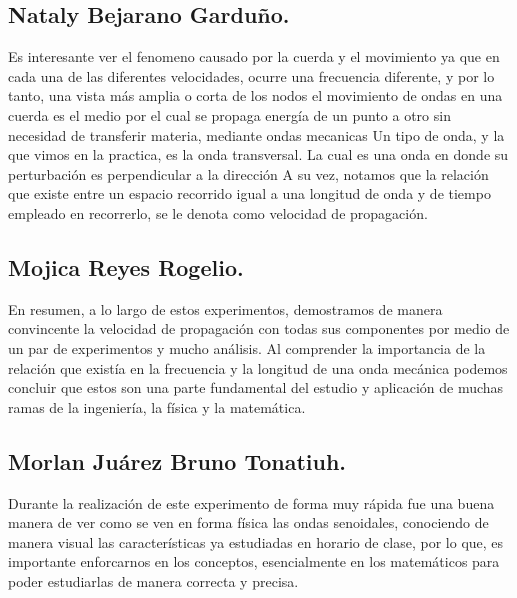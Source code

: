 \documentclass[10pt]{article}
\begin{document}
\begin{multicols}{2}
\subsection{Nataly Bejarano Garduño.}
Es interesante ver el fenomeno causado por la cuerda y el movimiento ya que en cada una de las diferentes velocidades, ocurre una frecuencia diferente, y por lo tanto, una vista más amplia o corta de los nodos el movimiento de ondas en una cuerda es el medio por el cual se propaga energía de un punto a otro sin necesidad de transferir materia, mediante ondas mecanicas Un tipo de onda, y la que vimos en la practica, es la onda transversal. La cual es una onda en donde su perturbación es perpendicular a la dirección A su vez, notamos que la relación que existe entre un espacio recorrido igual a una longitud de onda y de tiempo empleado en recorrerlo, se le denota como velocidad de propagación.
\subsection{Mojica Reyes Rogelio.}
En resumen, a lo largo de estos experimentos, demostramos de manera convincente la velocidad de propagación con todas sus componentes por medio de un par de experimentos y mucho análisis. Al comprender la importancia de la relación que existía en la frecuencia y la longitud de una onda mecánica podemos concluir que estos son una parte fundamental del estudio y aplicación de muchas ramas de la ingeniería, la física y la matemática. 
\subsection*{Morlan Juárez Bruno Tonatiuh.}
Durante la realización de este experimento de forma muy rápida fue una buena manera de ver como se ven en forma física las ondas senoidales, conociendo de manera visual las características ya estudiadas en horario de clase, por lo que, es importante enforcarnos en los conceptos, esencialmente en los matemáticos para poder estudiarlas de manera correcta y precisa. 

\end{multicols}
\end{document}
